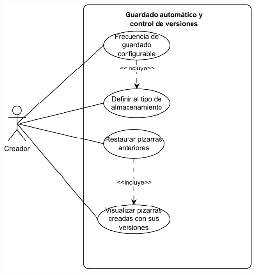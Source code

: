 \documentclass[a4paper, oneside, final]{scrartcl}
\begin{document}
\includegraphics[width=\textwidth]{images/Casos-de-uso-3.pdf}


{}

\end{document}
